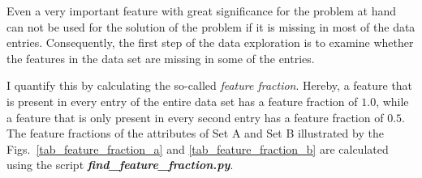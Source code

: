 Even a very important feature with great significance for the problem at hand can not be used for the solution of the problem if it is missing in most of the data entries. Consequently, the first step of the data exploration is to examine whether the features in the data set are missing in some of the entries. 

I quantify this by calculating the so-called \emph{feature fraction}. Hereby, a feature that is present in every entry of the entire data set has a feature fraction of $1.0$, while a feature that is only present in every second entry has a feature fraction of $0.5$. The feature fractions of the attributes of Set A and Set B illustrated by the Figs.~\ref{tab_feature_fraction_a} and \ref{tab_feature_fraction_b} are calculated using the script \textbf{\emph{find\_feature\_fraction.py}}.

